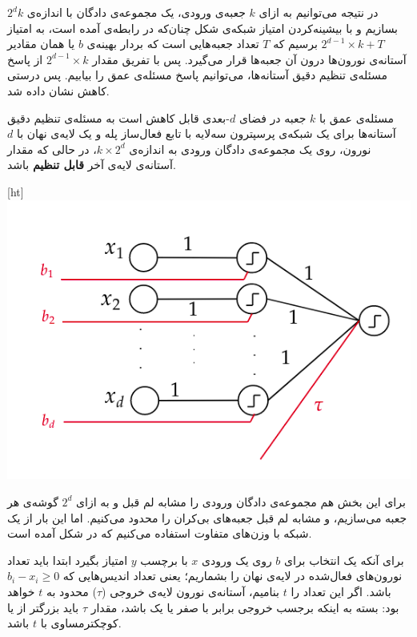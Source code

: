 در نتیجه می‌توانیم به ازای $k$ جعبه‌ی ورودی، یک مجموعه‌ی دادگان با اندازه‌ی
$2^d k$
بسازیم و با بیشینه‌کردن امتیاز شبکه‌ی
شکل 
چنان‌که در رابطه‌ی  آمده است، به امتیاز
$2^{d-1} \times k + T$
برسیم که $T$ تعداد جعبه‌هایی است که بردار بهینه‌ی $b$ یا همان مقادیر آستانه‌ی نورون‌ها درون آن جعبه‌ها قرار می‌گیرد. پس با تفریق مقدار
$2^{d-1} \times k$
از پاسخ مسئله‌ی تنظیم دقیق آستانه‌ها، می‌توانیم پاسخ مسئله‌ی عمق را بیابیم. پس درستی کاهش نشان داده شد.

مسئله‌ی عمق با $k$ جعبه در فضای $d$-بعدی قابل کاهش است به مسئله‌ی تنظیم دقیق آستانه‌ها برای یک شبکه‌ی پرسپترون سه‌لایه با تابع فعال‌ساز پله و یک لایه‌ی نهان با $d$ نورون، روی یک مجموعه‌ی دادگان ورودی به اندازه‌ی $k \times 2^d$، در حالی که مقدار آستانه‌ی لایه‌ی آخر \textbf{قابل تنظیم} باشد.


[ht]
\centering
\includegraphics[scale=0.5]{figs/reductionUnknownThreshold.png}

برای این بخش هم مجموعه‌ی دادگان ورودی را مشابه لم قبل و به ازای $2^d$ گوشه‌ی هر جعبه می‌سازیم، و مشابه لم قبل جعبه‌های بی‌کران را محدود می‌کنیم. اما این بار از یک شبکه با وزن‌های متفاوت استفاده می‌کنیم که در شکل  آمده است.

برای آنکه یک انتخاب برای $b$ روی یک ورودی $x$ با برچسب $y$ امتیاز بگیرد ابتدا باید تعداد نورون‌های فعال‌شده در لایه‌ی نهان را بشماریم؛ یعنی تعداد اندیس‌هایی که
$b_i - x_i \ge 0$
باشد. اگر این تعداد را $t$ بنامیم، آستانه‌ی نورون لایه‌ی خروجی ($\tau$) محدود به $t$ خواهد بود: بسته به اینکه برجسب خروجی برابر با صفر یا یک باشد، مقدار $\tau$ باید بزرگتر از یا کوچکترمساوی با $t$ باشد.

